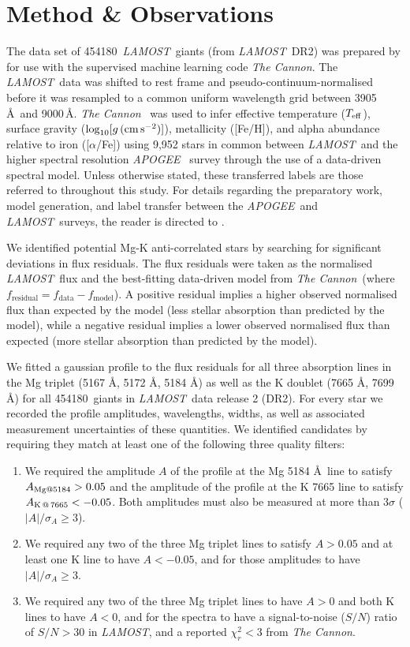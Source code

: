 \documentclass[a4paper,fleqn,usenatbib]{mnras}
\newcommand{\LamostGiants}{454180}
\newcommand{\project}[1]{\emph{#1}}
\newcommand{\lamost}{\project{LAMOST}}
\newcommand{\apogee}{\project{APOGEE}}
\newcommand{\tc}{\project{The Cannon}}
\newcommand{\teff}{T_{\rm eff}}
\newcommand{\logg}{\log_{10}[g\,({\rm cm\,s}^{-2})]}
\begin{document}
\section{Method \& Observations}
\label{sec:method}
The data set of \LamostGiants\ \lamost\ giants (from \lamost\ DR2) was prepared by \citet{ho2017} for use with the supervised machine learning code \tc. The \lamost\ data was shifted to rest frame and pseudo-continuum-normalised before it was resampled to a common uniform wavelength grid between 3905\,\AA\ and 9000\,\AA. \tc\ \citep{ness2016,ho2017} was used to infer effective temperature ($\teff$), surface gravity ($\logg$), metallicity ([Fe/H]), and alpha abundance relative to iron ([$\alpha$/Fe]) using 9,952 stars in common between \lamost\ and the higher spectral resolution \apogee\ \citep{alam2015} survey through the use of a data-driven spectral model. Unless otherwise stated, these transferred labels are those referred to throughout this study. For details regarding the preparatory work, model generation, and label transfer between the \apogee\ and \lamost\ surveys, the reader is directed to \citet{ho2017}. 

We identified potential Mg-K anti-correlated stars by searching for significant deviations in flux residuals. The flux residuals were taken as the normalised \lamost\ flux and the best-fitting data-driven model from \tc\ (where $f_{\textrm{residual}} = f_{\textrm{data}} - f_{\textrm{model}}$). A positive residual implies a higher observed normalised flux than expected by the model (less stellar absorption than predicted by the model), while a negative residual implies a lower observed normalised flux than expected (more stellar absorption than predicted by the model). 

We fitted a gaussian profile to the flux residuals for all three absorption lines in the Mg triplet (5167 \AA, 5172 \AA, 5184 \AA) as well as the K doublet (7665 \AA, 7699 \AA) for all \LamostGiants\ giants in \lamost\ data release 2 (DR2). For every star we recorded the profile amplitudes, wavelengths, widths, as well as associated measurement uncertainties of these quantities. We identified candidates by requiring they match at least one of the following three quality filters:
\begin{enumerate}
\item We required the amplitude $A$ of the profile at the Mg 5184 \AA \ line to satisfy $A_{{\rm Mg} @ 5184} > 0.05$ and the amplitude of the profile at the K 7665 line to satisfy $A_{{\rm K}\,@\,7665} < -0.05$. Both amplitudes must also be measured at more than $3\sigma$ ($|A|/\sigma_{A} \geq 3$).
\item We required any two of the three Mg triplet lines to satisfy $A > 0.05$ and at least one K line to have $A < -0.05$, and for those amplitudes to have $|A|/\sigma_{A} \geq 3$.
\item We required any two of the three Mg triplet lines to have $A > 0$ and both K lines to have $A < 0$, and for the spectra to have a signal-to-noise ($S/N$) ratio of $S/N > 30$ in \lamost, and a reported $\chi_{r}^2 < 3$ from \tc.
\end{enumerate} 
 
\end{document}
